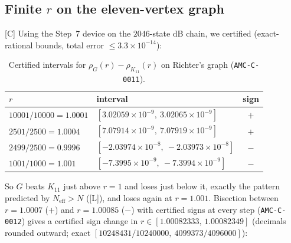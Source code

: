\documentclass[10pt]{article}
\newcommand{\tier}[1]{\textsf{[#1]}}
\newcommand{\tL}{\tier{L}}
\newcommand{\tC}{\tier{C}}
\newcommand{\Neff}{N_{\mathrm{eff}}}
\begin{document}
\subsection{Finite $r$ on the eleven-vertex graph}
\tC{} Using the Step~7 device on the $2046$-state dB chain, we certified (exact-rational bounds, total error $\le3.3\times10^{-14}$):
\begin{table}[h]\centering\small
\caption{Certified intervals for $\rho_G(r)-\rho_{K_{11}}(r)$ on Richter's graph (\texttt{AMC-C-0011}).}
\begin{tabular}{llc}\toprule
$r$ & interval & sign\\\midrule
$10001/10000=1.0001$ & $[3.02059\times10^{-9},\ 3.02065\times10^{-9}]$ & $+$\\
$2501/2500=1.0004$ & $[7.07914\times10^{-9},\ 7.07919\times10^{-9}]$ & $+$\\
$2499/2500=0.9996$ & $[-2.03974\times10^{-8},\ -2.03973\times10^{-8}]$ & $-$\\
$1001/1000=1.001$ & $[-7.3995\times10^{-9},\ -7.3994\times10^{-9}]$ & $-$\\\bottomrule
\end{tabular}
\end{table}
So $G$ beats $K_{11}$ just above $r=1$ and loses just below it, exactly the pattern predicted by $\Neff>N$ (\tL), and loses again at $r=1.001$. Bisection between $r=1.0007$ ($+$) and $r=1.00085$ ($-$) with certified signs at every step
(\texttt{AMC-C-0012}) gives a certified sign change in $r\in[1.00082333,\,1.00082349]$ (decimals rounded outward; exact $[10248431/10240000,\ 4099373/4096000]$):
\end{document}
